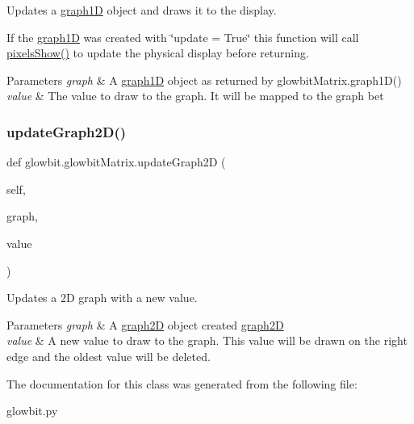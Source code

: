 Updates a \hyperlink{classglowbit_1_1glowbitMatrix_1_1graph1D}{graph1D} object and draws it to the display. 

If the \hyperlink{classglowbit_1_1glowbitMatrix_1_1graph1D}{graph1D} was created with \char`\"{}update = True\char`\"{} this function will call \hyperlink{classglowbit_1_1glowbit_a051aed2a4969fdcb0466e4e840209279}{pixels\+Show()} to update the physical display before returning.


\begin{DoxyParams}{Parameters}
{\em graph} & A \hyperlink{classglowbit_1_1glowbitMatrix_1_1graph1D}{graph1D} object as returned by glowbit\+Matrix.\+graph1\+D() \\
\hline
{\em value} & The value to draw to the graph. It will be mapped to the graph bet \\
\hline
\end{DoxyParams}
\mbox{\label{classglowbit_1_1glowbitMatrix_ae9083babec0d5004363782540b60baed}} 
\subsubsection{\texorpdfstring{update\+Graph2\+D()}{updateGraph2D()}}
{\footnotesize\ttfamily def glowbit.\+glowbit\+Matrix.\+update\+Graph2D (\begin{DoxyParamCaption}\item[{}]{self,  }\item[{}]{graph,  }\item[{}]{value }\end{DoxyParamCaption})}



Updates a 2D graph with a new value. 


\begin{DoxyParams}{Parameters}
{\em graph} & A \hyperlink{classglowbit_1_1glowbitMatrix_1_1graph2D}{graph2D} object created \hyperlink{classglowbit_1_1glowbitMatrix_1_1graph2D}{graph2D} \\
\hline
{\em value} & A new value to draw to the graph. This value will be drawn on the right edge and the oldest value will be deleted. \\
\hline
\end{DoxyParams}


The documentation for this class was generated from the following file\+:\begin{DoxyCompactItemize}
\item 
glowbit.\+py\end{DoxyCompactItemize}

